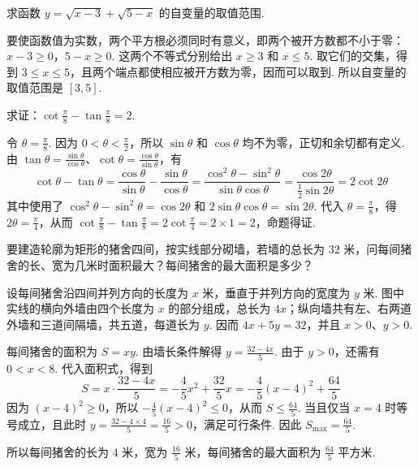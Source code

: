 \begin{problem}
求函数 \(y=\sqrt{x-3}+\sqrt{5-x}\) 的自变量的取值范围.
\end{problem}

\begin{solution}
要使函数值为实数，两个平方根必须同时有意义，即两个被开方数都不小于零：\(x-3\geq 0\)，\(5-x\geq 0\). 这两个不等式分别给出 \(x\geq 3\) 和 \(x\leq 5\). 取它们的交集，得到 \(3\leq x\leq 5\)，且两个端点都使相应被开方数为零，因而可以取到. 所以自变量的取值范围是 \([3,5]\).
\end{solution}

\begin{problem}
求证：\(\cot\frac{\pi}{8}-\tan\frac{\pi}{8}=2\).
\end{problem}

\begin{solution}
令 \(\theta=\frac{\pi}{8}\). 因为 \(0<\theta<\frac{\pi}{2}\)，所以 \(\sin\theta\) 和 \(\cos\theta\) 均不为零，正切和余切都有定义. 由 \(\tan\theta=\frac{\sin\theta}{\cos\theta}\)、\(\cot\theta=\frac{\cos\theta}{\sin\theta}\)，有
\[
\cot\theta-\tan\theta
=\frac{\cos\theta}{\sin\theta}-\frac{\sin\theta}{\cos\theta}
=\frac{\cos^2\theta-\sin^2\theta}{\sin\theta\cos\theta}
=\frac{\cos 2\theta}{\frac{1}{2}\sin 2\theta}=2\cot 2\theta
\]
其中使用了 \(\cos^2\theta-\sin^2\theta=\cos 2\theta\) 和 \(2\sin\theta\cos\theta=\sin 2\theta\). 代入 \(\theta=\frac{\pi}{8}\)，得 \(2\theta=\frac{\pi}{4}\)，从而 \(\cot\frac{\pi}{8}-\tan\frac{\pi}{8}=2\cot\frac{\pi}{4}=2\times1=2\)，命题得证.
\end{solution}

\begin{problem}
要建造轮廓为矩形的猪舍四间，按实线部分砌墙，若墙的总长为 \(32\text{ 米}\)，问每间猪舍的长、宽为几米时面积最大？每间猪舍的最大面积是多少？

\end{problem}

\begin{solution}
设每间猪舍沿四间并列方向的长度为 \(x\text{ 米}\)，垂直于并列方向的宽度为 \(y\text{ 米}\). 图中实线的横向外墙由四个长度为 \(x\) 的部分组成，总长为 \(4x\)；纵向墙共有左、右两道外墙和三道间隔墙，共五道，每道长为 \(y\). 因而 \(4x+5y=32\)，并且 \(x>0\)、\(y>0\).

每间猪舍的面积为 \(S=xy\). 由墙长条件解得 \(y=\frac{32-4x}{5}\). 由于 \(y>0\)，还需有 \(0<x<8\). 代入面积式，得到
\[
S=x\cdot\frac{32-4x}{5}=-\frac{4}{5}x^2+\frac{32}{5}x
=-\frac{4}{5}(x-4)^2+\frac{64}{5}
\]
因为 \((x-4)^2\geq 0\)，所以 \(-\frac{4}{5}(x-4)^2\leq 0\)，从而 \(S\leq\frac{64}{5}\). 当且仅当 \(x=4\) 时等号成立，且此时 \(y=\frac{32-4\times4}{5}=\frac{16}{5}>0\)，满足可行条件. 因此 \(S_{\max}=\frac{64}{5}\).

所以每间猪舍的长为 \(4\text{ 米}\)，宽为 \(\frac{16}{5}\text{ 米}\)，每间猪舍的最大面积为 \(\frac{64}{5}\text{ 平方米}\).
\end{solution}


